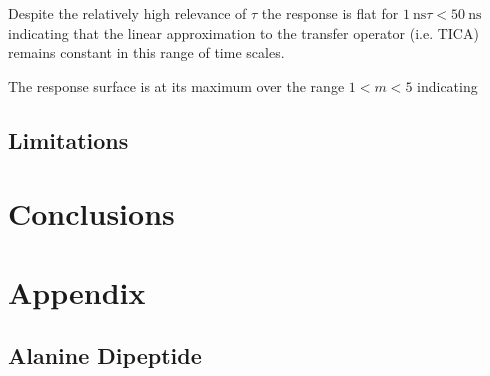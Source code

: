 Despite the relatively high relevance of $\tau$ the response is flat for $\SI{1}{\nano\second} \tau < \SI{50}{\nano\second}$ indicating that the linear approximation to the transfer operator (i.e. TICA) remains constant in this range of time scales. 




The response surface is at its maximum over the range $1 < m < 5$ indicating 



\subsection{Limitations}

\section{Conclusions}


\section{Appendix}\label{app:msm_opt}

\subsection{Alanine Dipeptide}

